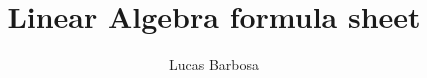 \documentclass[nohyper,nobib,nofonts,oneside,openany]{tufte-book}
\title{Linear Algebra formula sheet}
\author[Lucas Barbosa]{Lucas Barbosa}
\date{}
\begin{document}
\pagestyle{empty}
\renewcommand{\thesection}{\arabic{section}}

\end{document}
